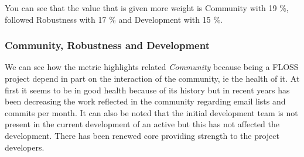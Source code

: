 \documentclass[11pt]{scrartcl}
\begin{document}
\par You can see that the value that is given more weight is Community with 19 \%, followed Robustness with 17 \% and Development with 15 \%. 

\subsubsection{Community, Robustness and Development}

\par We can see how the metric highlights related \emph{Community} because being a FLOSS project depend in part on the interaction of the community, ie the health of it. At first it seems to be in good health because of its history but in recent years has been decreasing the work reflected in the community regarding email lists and commits per month. It can also be noted that the initial development team is not present in the current development of an active but this has not affected the development. There has been renewed core providing strength to the project developers.
\end{document}
